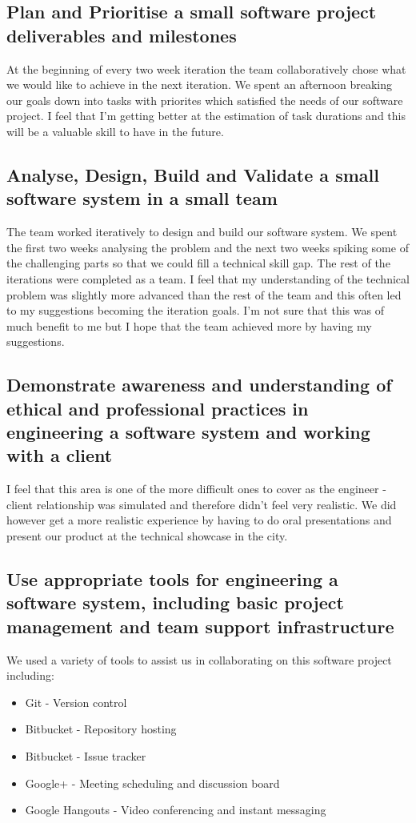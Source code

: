 \documentclass{article}
\begin{document}
\subsection{Plan and Prioritise a small software project deliverables and milestones}
At the beginning of every two week iteration the team collaboratively chose what we would like to achieve in the next iteration. We spent an afternoon breaking our goals down into tasks with priorites which satisfied the needs of our software project. I feel that I'm getting better at the estimation of task durations and this will be a valuable skill to have in the future.

\subsection{Analyse, Design, Build and Validate a small software system in a small team}
The team worked iteratively to design and build our software system. We spent the first two weeks analysing the problem and the next two weeks spiking some of the challenging parts so that we could fill a technical skill gap. The rest of the iterations were completed as a team. I feel that my understanding of the technical problem was slightly more advanced than the rest of the team and this often led to my suggestions becoming the iteration goals. I'm not sure that this was of much benefit to me but I hope that the team achieved more by having my suggestions.

\subsection{Demonstrate awareness and understanding of ethical and professional practices in engineering a software system and working with a client}
I feel that this area is one of the more difficult ones to cover as the engineer - client relationship was simulated and therefore didn't feel very realistic. We did however get a more realistic experience by having to do oral presentations and present our product at the technical showcase in the city.

\subsection{Use appropriate tools for engineering a software system, including basic project management and team support infrastructure}
We used a variety of tools to assist us in collaborating on this software project including:
\begin{itemize}
	\item{Git - Version control}
	\item{Bitbucket - Repository hosting}
	\item{Bitbucket - Issue tracker}
	\item{Google+ - Meeting scheduling and discussion board}
	\item{Google Hangouts - Video conferencing and instant messaging}
\end{itemize}
\end{document}
